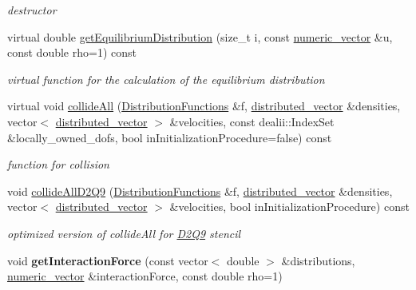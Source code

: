 \begin{DoxyCompactItemize}
\begin{DoxyCompactList}\small\item\em destructor \item\end{DoxyCompactList}\item 
virtual double \hyperlink{classnatrium_1_1BGKPseudopotential_a366ccd417ca4ad5fa37ce0572e0d6fe4}{getEquilibriumDistribution} (size\_\-t i, const \hyperlink{namespacenatrium_a67c39077adc6634f8fa3762b8eef24c4}{numeric\_\-vector} \&u, const double rho=1) const 
\begin{DoxyCompactList}\small\item\em virtual function for the calculation of the equilibrium distribution \item\end{DoxyCompactList}\item 
virtual void \hyperlink{classnatrium_1_1BGKPseudopotential_afa18cdab45c73c33b2660f37d0ca82ba}{collideAll} (\hyperlink{classnatrium_1_1DistributionFunctions}{DistributionFunctions} \&f, \hyperlink{namespacenatrium_a903d2b92917f582f2ff05f52160ab811}{distributed\_\-vector} \&densities, vector$<$ \hyperlink{namespacenatrium_a903d2b92917f582f2ff05f52160ab811}{distributed\_\-vector} $>$ \&velocities, const dealii::IndexSet \&locally\_\-owned\_\-dofs, bool inInitializationProcedure=false) const 
\begin{DoxyCompactList}\small\item\em function for collision \item\end{DoxyCompactList}\item 
void \hyperlink{classnatrium_1_1BGKPseudopotential_acf03df141262b39a778e327bf0c25c2a}{collideAllD2Q9} (\hyperlink{classnatrium_1_1DistributionFunctions}{DistributionFunctions} \&f, \hyperlink{namespacenatrium_a903d2b92917f582f2ff05f52160ab811}{distributed\_\-vector} \&densities, vector$<$ \hyperlink{namespacenatrium_a903d2b92917f582f2ff05f52160ab811}{distributed\_\-vector} $>$ \&velocities, bool inInitializationProcedure) const 
\begin{DoxyCompactList}\small\item\em optimized version of collideAll for \hyperlink{classnatrium_1_1D2Q9}{D2Q9} stencil \item\end{DoxyCompactList}\item 
\hypertarget{classnatrium_1_1BGKPseudopotential_a5ac200313ed0ebe9c8df8f179925e2ed}{
void {\bfseries getInteractionForce} (const vector$<$ double $>$ \&distributions, \hyperlink{namespacenatrium_a67c39077adc6634f8fa3762b8eef24c4}{numeric\_\-vector} \&interactionForce, const double rho=1)}
\label{classnatrium_1_1BGKPseudopotential_a5ac200313ed0ebe9c8df8f179925e2ed}


\end{DoxyCompactItemize}
